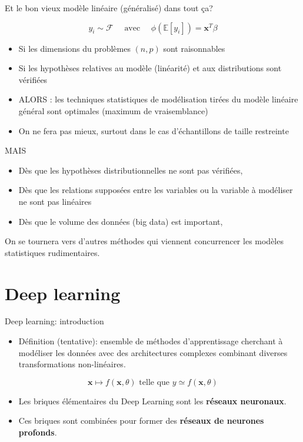 \documentclass[ignorenonframetext,]{beamer}
\providecommand{\tightlist}{%
  \setlength{\itemsep}{0pt}\setlength{\parskip}{0pt}}
\begin{document}
\begin{frame}{Et le bon vieux modèle linéaire (généralisé) dans tout
ça?}

\[ y_i \sim  \mathcal{F} \quad \mbox{ avec } \quad \phi(\mathbb{E}[y_i]) = \mathbf{x}^T\beta\]

\begin{itemize}
\tightlist
\item
  Si les dimensions du problèmes \((n, p)\) sont raisonnables
\item
  Si les hypothèses relatives au modèle (linéarité) et aux distributions
  sont vérifiées
\item
  ALORS : les techniques statistiques de modélisation tirées du modèle
  linéaire général sont optimales (maximum de vraisemblance)
\item
  On ne fera pas mieux, surtout dans le cas d'échantillons de taille
  restreinte
\end{itemize}

\end{frame}

\begin{frame}{MAIS}

\begin{itemize}
\tightlist
\item
  Dès que les hypothèses distributionnelles ne sont pas vérifiées,
\item
  Dès que les relations supposées entre les variables ou la variable à
  modéliser ne sont pas linéaires
\item
  Dès que le volume des données (big data) est important,
\end{itemize}

On se tournera vers d'autres méthodes qui viennent concurrencer les
modèles statistiques rudimentaires.

\end{frame}

\section{Deep learning}\label{deep-learning}

\begin{frame}{Deep learning: introduction}

\begin{itemize}
\tightlist
\item
  Définition (tentative): ensemble de méthodes d'apprentissage cherchant
  à modéliser les données avec des architectures complexes combinant
  diverses transformations non-linéaires.
\end{itemize}

\[ \mathbf{x} \mapsto f(\mathbf{x},\theta) \mbox{ telle que } 
y \simeq f(\mathbf{x},\theta)\]

\begin{itemize}
\tightlist
\item
  Les briques élémentaires du Deep Learning sont les \textbf{réseaux
  neuronaux}.
\item
  Ces briques sont combinées pour former des \textbf{réseaux de neurones
  profonds}.
\end{itemize}

\end{frame}
\end{document}
